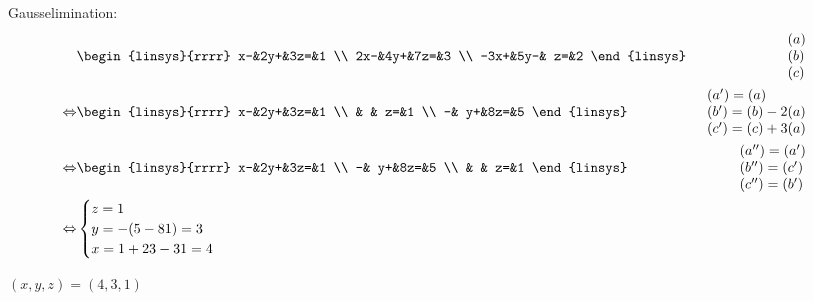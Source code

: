 \begin{task}{1.6}
	Gausselimination:
	\begin{align*}
		&\begin{linsys}{rrrr}
			  x-&2y+&3z=&1 \\
			 2x-&4y+&7z=&3 \\
			-3x+&5y-& z=&2
		\end{linsys}
		&\begin{array}{l} 
			(a) \\ 
			(b) \\
			(c)
		\end{array} \\ \lra
		&\begin{linsys}{rrrr}
			x-&2y+&3z=&1 \\
			  &   & z=&1 \\
			 -& y+&8z=&5
		\end{linsys} 
		&\begin{array}{l} 
			(a')=(a) \\ 
			(b')=(b)-2(a) \\
			(c')=(c)+3(a)
		\end{array} \\ \lra
		&\begin{linsys}{rrrr}
			x-&2y+&3z=&1 \\
			 -& y+&8z=&5 \\
			  &   & z=&1
		\end{linsys}
		&\begin{array}{l} 
			(a'')=(a') \\ 
			(b'')=(c') \\
			(c'')=(b')
		\end{array} \\ \lra
		&\begin{cases}
			z=1 \\
			y=-(5-8\*1)=3\\
			x=1+2\*3-3\*1=4
		\end{cases}
	\end{align*}
	
	\ans $(x,y,z)=(4,3,1)$
\end{task}


